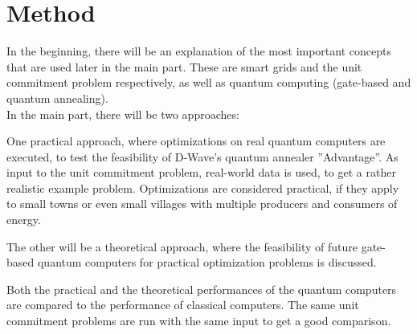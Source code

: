 \section{Method}

In the beginning, there will be an explanation of the most important concepts
that are used later in the main part.
These are smart grids and the unit commitment problem respectively,
as well as quantum computing (gate-based and quantum annealing).\\

\noindent In the main part, there will be two approaches:

One practical approach, where optimizations on real quantum computers are executed,
to test the feasibility of D-Wave's quantum annealer ''Advantage''.
As input to the unit commitment problem, real-world data is used, to get a rather realistic example problem.
Optimizations are considered practical, if they apply to small towns or even small villages
with multiple producers and consumers of energy.

The other will be a theoretical approach, where the feasibility of future gate-based quantum computers
for practical optimization problems is discussed.

Both the practical and the theoretical performances of the quantum computers
are compared to the performance of classical computers.
The same unit commitment problems are run with the same input to get a good comparison.
